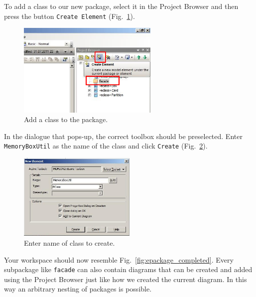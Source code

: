 To add a class to our new package, select it in the Project Browser and then
press the button \texttt{Create Element} (Fig.~\ref{fig:epackage_newelement}).  

\begin{figure}[htbp]
	\centering
  \includegraphics[width=0.6\textwidth]{pics/memBox19.png}
	\caption{Add a class to the package.}
	\label{fig:epackage_newelement}
\end{figure}

In the dialogue that pops-up, the correct toolbox should be preselected.  Enter
\texttt{MemoryBoxUtil} as the name of the class and click \texttt{Create}
(Fig.~\ref{fig:epackage_createelement}).

\begin{figure}[htbp]
	\centering
  \includegraphics[width=0.5\textwidth]{pics/memBox20.png}
	\caption{Enter name of class to create.}
	\label{fig:epackage_createelement}
\end{figure}

\clearpage

Your workspace should now resemble Fig.~\ref{fig:epackage_completed}.  Every
subpackage like \texttt{facade} can also contain diagrams that can be created
and added using the Project Browser just like how we created the current
diagram. In this way an arbitrary nesting of packages is possible.

